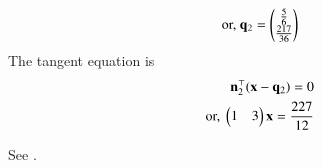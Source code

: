 \begin{enumerate}
\begin{align}
\end{align}
    \begin{align}
	    \text{or, }  \mathbf{q}_2=\begin{pmatrix}
	\frac{5}{6}
\\
	\frac{217}{36}
	\end{pmatrix}
\end{align}
The tangent equation is
\begin{align}
      \mathbf{n}_2^{\top}(\mathbf{x}-\mathbf{q}_2) = 0
      \\
	\text{or, }    \begin{pmatrix}1 & 3\end{pmatrix}\mathbf{x}= \frac{227}{12}
\end{align}
\end{enumerate}
		See .

